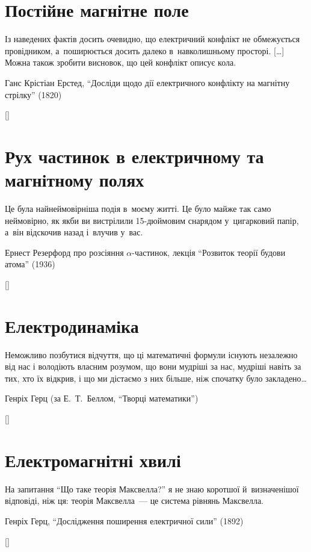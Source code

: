 \documentclass[biblatex]{ConspectBook}
\begin{document}
\part{Постійне магнітне поле}
\label{part:SteadyMagneticField}
\gdef\currentparttitle{Постійне магнітне поле}
\epigraph{\Alexander Із наведених фактів досить очевидно, що електричний конфлікт не обмежується провідником, а~поширюється досить далеко в~навколишньому просторі. [\ldots] Можна також зробити висновок, що цей конфлікт описує кола.}{Ганс Крістіан Ерстед, \enquote{Досліди щодо дії електричного конфлікту на магнітну стрілку} (1820)}
[]

\part{Рух частинок в електричному та магнітному полях}
\label{part:ChargedParticleMotion}
\gdef\currentparttitle{Рух частинок у полях}
\epigraph{\Alexander Це була найнеймовірніша подія в~моєму житті. Це було майже так само неймовірно, як якби ви вистрілили 15-дюймовим снарядом у~цигарковий папір, а~він відскочив назад і~влучив у~вас.}{Ернест Резерфорд про розсіяння $\alpha$-частинок, лекція \enquote{Розвиток теорії будови атома} (1936)}
[]

\part{Електродинаміка}
\label{part:Electrodynamics}
\gdef\currentparttitle{Електродинаміка}
\epigraph{\Alexander Неможливо позбутися відчуття, що ці математичні формули існують незалежно від нас і володіють власним розумом, що вони мудріші за нас, мудріші навіть за тих, хто їх відкрив, і що ми дістаємо з них більше, ніж спочатку було закладено\ldots}{Генріх Герц (за Е.~Т.~Беллом, \enquote{Творці математики})}
[]

\part{Електромагнітні хвилі}
\label{part:ElectromagneticWaves}
\gdef\currentparttitle{Електромагнітні хвилі}
\epigraph{\Alexander На запитання \enquote{Що таке теорія Максвелла?} я не знаю коротшої й~визначенішої відповіді, ніж ця: теорія Максвелла~--- це система рівнянь Максвелла.}{Генріх Герц, \enquote{Дослідження поширення електричної сили} (1892)}
[]
\end{document}
